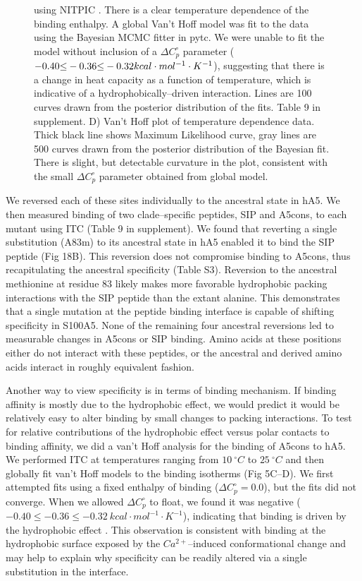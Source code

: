 \begin{figure}
{using NITPIC \citep{keller_high-precision_2012}. There is a clear
temperature dependence of the binding enthalpy. A global Van't Hoff
model was fit to the data using the Bayesian MCMC fitter in pytc.
We were unable to fit the model without inclusion of a $\Delta C_{p}^{\circ}$
parameter ($-0.40\text{\ensuremath{\le}}-0.36\text{\ensuremath{\le}}-0.32kcal\cdot mol^{-1}\cdot K^{-1}$),
suggesting that there is a change in heat capacity as a function of
temperature, which is indicative of a hydrophobically--driven interaction.
Lines are 100 curves drawn from the posterior distribution of the
fits. Table 9 in supplement. D) Van't Hoff plot of temperature dependence data.
Thick black line shows Maximum Likelihood curve, gray lines are 500
curves drawn from the posterior distribution of the Bayesian fit.
There is slight, but detectable curvature in the plot, consistent
with the small $\Delta C_{p}^{\circ}$ parameter obtained from global
model.\label{samplefigure}}	
\end{figure}

We reversed each of these sites individually to the ancestral state
in hA5. We then measured binding of two clade--specific peptides, SIP
and A5cons, to each mutant using ITC (Table 9 in supplement). We found that reverting
a single substitution (A83m) to its ancestral state in hA5 enabled
it to bind the SIP peptide (Fig 18B). This reversion does not compromise
binding to A5cons, thus recapitulating the ancestral specificity (Table
S3). Reversion to the ancestral methionine at residue 83 likely makes
more favorable hydrophobic packing interactions with the SIP peptide
than the extant alanine. This demonstrates that a single mutation
at the peptide binding interface is capable of shifting specificity
in S100A5. None of the remaining four ancestral reversions led to
measurable changes in A5cons or SIP binding. Amino acids at these
positions either do not interact with these peptides, or the ancestral
and derived amino acids interact in roughly equivalent fashion. 

Another way to view specificity is in terms of binding mechanism.
If binding affinity is mostly due to the hydrophobic effect, we would
predict it would be relatively easy to alter binding by small changes
to packing interactions. To test for relative contributions of the
hydrophobic effect versus polar contacts to binding affinity, we did
a van't Hoff analysis for the binding of A5cons to hA5. We performed
ITC at temperatures ranging from $10\ ^{\circ}C$ to $25\ ^{\circ}C$
and then globally fit van't Hoff models to the binding isotherms (Fig
5C--D). We first attempted fits using a fixed enthalpy of binding ($\Delta C_{p}^{\circ}=0.0$),
but the fits did not converge. When we allowed $\Delta C_{p}^{\circ}$
to float, we found it was negative ($-0.40\le-0.36\le-0.32\ kcal\cdot mol^{-1}\cdot K^{-1}$),
indicating that binding is driven by the hydrophobic effect \citep{connelly_heat_1992}.
This observation is consistent with binding at the hydrophobic surface
exposed by the $Ca^{2+}$–induced conformational change \citep{bertini_solution_2009}
and may help to explain why specificity can be readily altered via
a single substitution in the interface.

